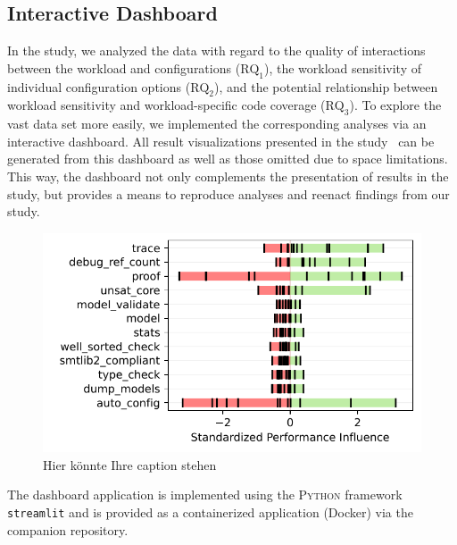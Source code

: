 \documentclass[10pt,conference]{IEEEtran}
\begin{document}
	\subsection{Interactive Dashboard}
	In the study, we analyzed the data with regard to the quality of interactions between the workload and configurations ($\text{RQ}_\text{1}$), the workload sensitivity of individual configuration options ($\text{RQ}_\text{2}$), and the potential relationship between workload sensitivity and workload-specific code coverage ($\text{RQ}_\text{3}$). To explore the vast data set more easily, we implemented the corresponding analyses via an interactive dashboard. All result visualizations presented in the study~\cite{muhlbauer_workload_2023} can be generated from this dashboard as well as those omitted due to space limitations. This way, the dashboard not only complements the presentation of results in the study, but provides a means to reproduce analyses and reenact findings from our study.
	
	\begin{figure}
		\centering
		\includegraphics[width=\linewidth]{images/z3.pdf}
		\caption{Hier könnte Ihre caption stehen}
	\end{figure}
	
	The dashboard application is implemented using the \textsc{Python} framework \texttt{streamlit} and is provided as a containerized application (Docker) via the companion repository.
	
	
	
	
\end{document}
